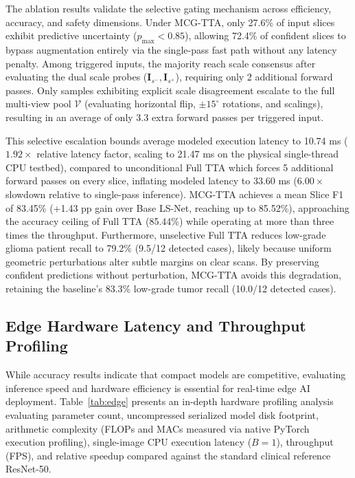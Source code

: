\documentclass[journal]{IEEEtran}
\begin{document}
The ablation results validate the selective gating mechanism across efficiency, accuracy, and safety dimensions. Under MCG-TTA, only 27.6\% of input slices exhibit predictive uncertainty ($p_{\max} < 0.85$), allowing 72.4\% of confident slices to bypass augmentation entirely via the single-pass fast path without any latency penalty. Among triggered inputs, the majority reach scale consensus after evaluating the dual scale probes ($\mathbf{I}_{s^-}, \mathbf{I}_{s^+}$), requiring only 2 additional forward passes. Only samples exhibiting explicit scale disagreement escalate to the full multi-view pool $\mathcal{V}$ (evaluating horizontal flip, $\pm 15^\circ$ rotations, and scalings), resulting in an average of only 3.3 extra forward passes per triggered input.

This selective escalation bounds average modeled execution latency to 10.74 ms ($1.92\times$ relative latency factor, scaling to 21.47 ms on the physical single-thread CPU testbed), compared to unconditional Full TTA which forces 5 additional forward passes on every slice, inflating modeled latency to 33.60 ms ($6.00\times$ slowdown relative to single-pass inference). MCG-TTA achieves a mean Slice F1 of 83.45\% (+1.43 pp gain over Base LS-Net, reaching up to 85.52\%), approaching the accuracy ceiling of Full TTA (85.44\%) while operating at more than three times the throughput. Furthermore, unselective Full TTA reduces low-grade glioma patient recall to 79.2\% (9.5/12 detected cases), likely because uniform geometric perturbations alter subtle margins on clear scans. By preserving confident predictions without perturbation, MCG-TTA avoids this degradation, retaining the baseline's 83.3\% low-grade tumor recall (10.0/12 detected cases).

\subsection{Edge Hardware Latency and Throughput Profiling}

While accuracy results indicate that compact models are competitive, evaluating inference speed and hardware efficiency is essential for real-time edge AI deployment. Table~\ref{tab:edge} presents an in-depth hardware profiling analysis evaluating parameter count, uncompressed serialized model disk footprint, arithmetic complexity (FLOPs and MACs measured via native PyTorch execution profiling), single-image CPU execution latency ($B=1$), throughput (FPS), and relative speedup compared against the standard clinical reference ResNet-50.
\end{document}
